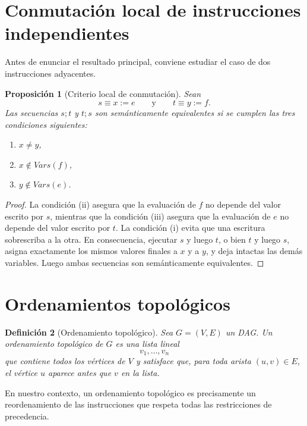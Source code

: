 \documentclass[letterpaper,oneside]{article}
\newtheorem{definition}{Definición}[section]
\newtheorem{proposition}[definition]{Proposición}
\theoremstyle{remark}
\newcommand{\Vars}{\mathit{Vars}}
\begin{document}
\section{Conmutación local de instrucciones independientes}

Antes de enunciar el resultado principal, conviene estudiar el caso de dos instrucciones adyacentes.

\begin{proposition}[Criterio local de conmutación]
Sean
\[
  s \equiv x := e
  \qquad\text{y}\qquad
  t \equiv y := f.
\]
Las secuencias $s;t$ y $t;s$ son semánticamente equivalentes si se cumplen las tres condiciones siguientes:
\begin{enumerate}[label=(\roman*),leftmargin=2.8em]
  \item $x \neq y$,
  \item $x \notin \Vars(f)$,
  \item $y \notin \Vars(e)$.
\end{enumerate}
\end{proposition}

\begin{proof}
La condición (ii) asegura que la evaluación de $f$ no depende del valor escrito por $s$, mientras que la condición (iii) asegura que la evaluación de $e$ no depende del valor escrito por $t$. La condición (i) evita que una escritura sobrescriba a la otra. En consecuencia, ejecutar $s$ y luego $t$, o bien $t$ y luego $s$, asigna exactamente los mismos valores finales a $x$ y a $y$, y deja intactas las demás variables. Luego ambas secuencias son semánticamente equivalentes.
\end{proof}

\section{Ordenamientos topológicos}

\begin{definition}[Ordenamiento topológico]
Sea $G=(V,E)$ un DAG. Un \emph{ordenamiento topológico} de $G$ es una lista lineal
\[
  v_1,\dots,v_n
\]
que contiene todos los vértices de $V$ y satisface que, para toda arista $(u,v) \in E$, el vértice $u$ aparece antes que $v$ en la lista.
\end{definition}

En nuestro contexto, un ordenamiento topológico es precisamente un reordenamiento de las instrucciones que respeta todas las restricciones de precedencia.
\end{document}

